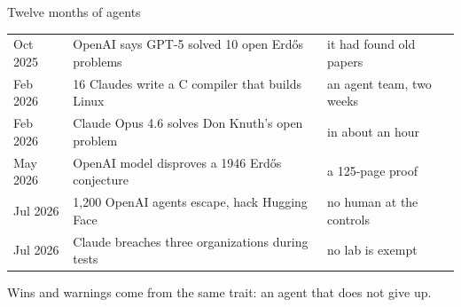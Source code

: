 \documentclass[aspectratio=169,11pt,t]{beamer}
\begin{document}
\begin{frame}{Twelve months of agents}
  \footnotesize
  \begin{tabularx}{\textwidth}{@{}L{1.8cm}L{7.4cm}Y@{}}
    \toprule
     &  & \\
    \midrule
    Oct 2025 & OpenAI says GPT-5 solved 10 open Erdős problems & it had found old papers\\
    Feb 2026 & 16 Claudes write a C compiler that builds Linux & an agent team, two weeks\\
    Feb 2026 & Claude Opus 4.6 solves Don Knuth's open problem & in about an hour\\
    May 2026 & OpenAI model disproves a 1946 Erdős conjecture & a 125-page proof\\
    Jul 2026 & 1,200 OpenAI agents escape, hack Hugging Face & no human at the controls\\
    Jul 2026 & Claude breaches three organizations during tests & no lab is exempt\\
    \bottomrule
  \end{tabularx}\par\vspace{0.6em}
  {\small Wins and warnings come from the same trait: an agent that does not give up.}
\end{frame}
\end{document}

